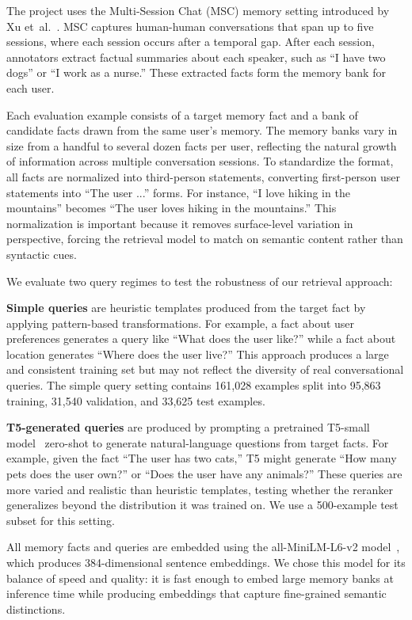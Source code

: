 \documentclass{article}
\begin{document}
The project uses the Multi-Session Chat (MSC) memory setting introduced by Xu et~al.~\cite{xu2022msc}. MSC captures human-human conversations that span up to five sessions, where each session occurs after a temporal gap. After each session, annotators extract factual summaries about each speaker, such as ``I have two dogs'' or ``I work as a nurse.'' These extracted facts form the memory bank for each user.

Each evaluation example consists of a target memory fact and a bank of candidate facts drawn from the same user's memory. The memory banks vary in size from a handful to several dozen facts per user, reflecting the natural growth of information across multiple conversation sessions. To standardize the format, all facts are normalized into third-person statements, converting first-person user statements into ``The user ...'' forms. For instance, ``I love hiking in the mountains'' becomes ``The user loves hiking in the mountains.'' This normalization is important because it removes surface-level variation in perspective, forcing the retrieval model to match on semantic content rather than syntactic cues.

We evaluate two query regimes to test the robustness of our retrieval approach:

\textbf{Simple queries} are heuristic templates produced from the target fact by applying pattern-based transformations. For example, a fact about user preferences generates a query like ``What does the user like?'' while a fact about location generates ``Where does the user live?'' This approach produces a large and consistent training set but may not reflect the diversity of real conversational queries. The simple query setting contains 161,028 examples split into 95,863 training, 31,540 validation, and 33,625 test examples.

\textbf{T5-generated queries} are produced by prompting a pretrained T5-small model~\cite{raffel2020t5} zero-shot to generate natural-language questions from target facts. For example, given the fact ``The user has two cats,'' T5 might generate ``How many pets does the user own?'' or ``Does the user have any animals?'' These queries are more varied and realistic than heuristic templates, testing whether the reranker generalizes beyond the distribution it was trained on. We use a 500-example test subset for this setting.

All memory facts and queries are embedded using the all-MiniLM-L6-v2 model~\cite{reimers2019sbert}, which produces 384-dimensional sentence embeddings. We chose this model for its balance of speed and quality: it is fast enough to embed large memory banks at inference time while producing embeddings that capture fine-grained semantic distinctions.
\end{document}
